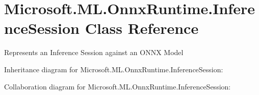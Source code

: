\hypertarget{classMicrosoft_1_1ML_1_1OnnxRuntime_1_1InferenceSession}{}\section{Microsoft.\+M\+L.\+Onnx\+Runtime.\+Inference\+Session Class Reference}
\label{classMicrosoft_1_1ML_1_1OnnxRuntime_1_1InferenceSession}


Represents an Inference Session against an O\+N\+NX Model  




Inheritance diagram for Microsoft.\+M\+L.\+Onnx\+Runtime.\+Inference\+Session\+:


Collaboration diagram for Microsoft.\+M\+L.\+Onnx\+Runtime.\+Inference\+Session\+:
